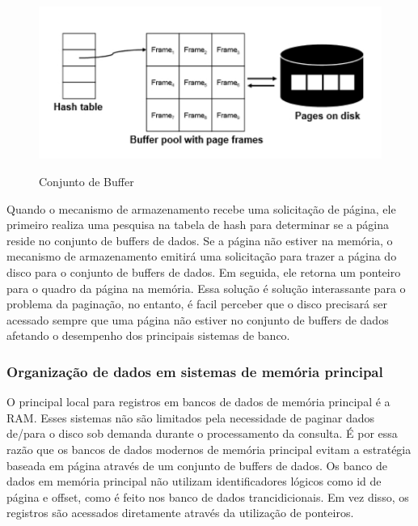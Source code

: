 \begin{figure}[H]
  \setlength{\abovecaptionskip}{0pt}
  \setlength{\belowcaptionskip}{0pt}
  \caption[Conjunto de Buffer]{Conjunto de Buffer}
  \centering
  \includegraphics[width=.85\textwidth]{imagem/buffer_pool.jpg}
  \captionsetup{justification=centering}
  \label{fig:ComponentesWiNoC}
\end{figure}

Quando o mecanismo de armazenamento recebe uma solicitação de página, ele primeiro realiza uma pesquisa na tabela de hash para determinar se a página reside no conjunto de buffers de dados. Se a página não estiver na memória, o mecanismo de armazenamento emitirá uma solicitação para trazer a página do disco para o conjunto de buffers de dados. Em seguida, ele retorna um ponteiro para o quadro da página na memória. Essa solução é solução interassante para o problema da paginação, no entanto, é facil perceber que o disco precisará ser acessado sempre que uma página não estiver no conjunto de buffers de dados afetando o desempenho dos principais sistemas de banco. 

\subsubsection{Organização de dados em sistemas de memória principal}

O principal local para registros em bancos de dados de memória principal é a RAM. Esses sistemas não são limitados pela necessidade de paginar dados de/para o disco sob demanda durante o processamento da consulta. É por essa razão que os bancos de dados modernos de memória principal evitam a estratégia baseada em página através de um conjunto de buffers de dados. Os banco de dados em memória principal não utilizam identificadores lógicos como id de página e offset, como é feito nos banco de dados trancidicionais. Em vez disso, os registros são acessados diretamente através da utilização de ponteiros. 

